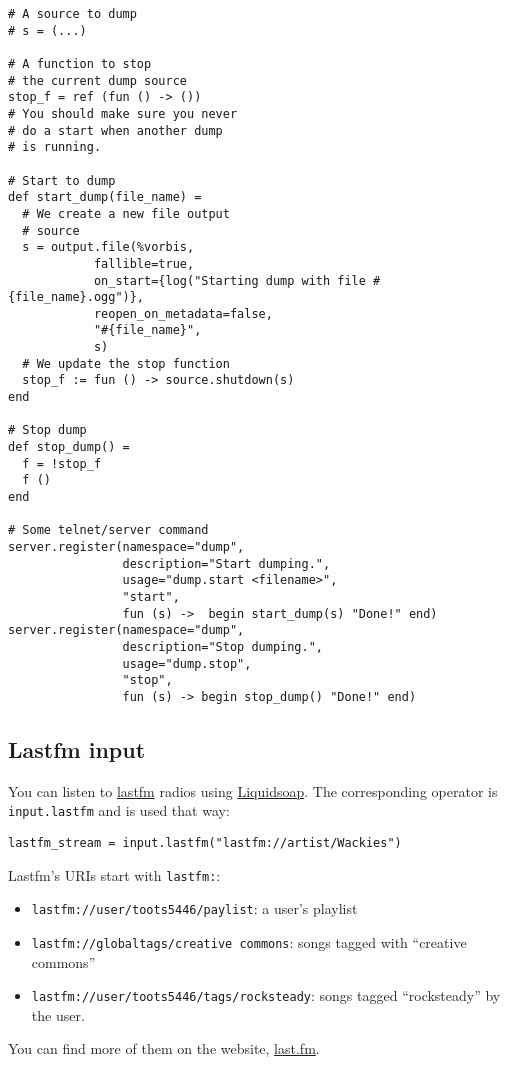 \begin{verbatim}
# A source to dump
# s = (...) 

# A function to stop
# the current dump source
stop_f = ref (fun () -> ())
# You should make sure you never
# do a start when another dump
# is running.

# Start to dump
def start_dump(file_name) =
  # We create a new file output
  # source
  s = output.file(%vorbis,
            fallible=true,
            on_start={log("Starting dump with file #{file_name}.ogg")},
            reopen_on_metadata=false,
            "#{file_name}",
            s)
  # We update the stop function
  stop_f := fun () -> source.shutdown(s)
end

# Stop dump
def stop_dump() =
  f = !stop_f
  f ()
end

# Some telnet/server command
server.register(namespace="dump",
                description="Start dumping.",
                usage="dump.start <filename>",
                "start",
                fun (s) ->  begin start_dump(s) "Done!" end)
server.register(namespace="dump",
                description="Stop dumping.",
                usage="dump.stop",
                "stop",
                fun (s) -> begin stop_dump() "Done!" end)
\end{verbatim}
\subsection{Lastfm input}
You can listen to \href{http://www.last.fm/}{lastfm} radios using \href{index.html}{Liquidsoap}. The corresponding operator is \verb+input.lastfm+ and is used that way:

\begin{verbatim}
lastfm_stream = input.lastfm("lastfm://artist/Wackies")
\end{verbatim}
Lastfm's URIs start with \verb+lastfm:+:

\begin{itemize}
\item \verb+lastfm://user/toots5446/paylist+: a user's playlist
\item \verb+lastfm://globaltags/creative commons+: songs tagged with ``creative commons''
\item \verb+lastfm://user/toots5446/tags/rocksteady+: songs tagged ``rocksteady'' by the user.

\end{itemize}
You can find more of them on the website, \href{http://www.last.fm/}{last.fm}.


